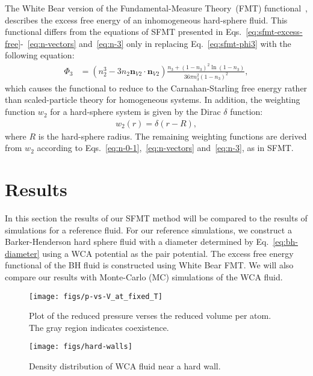 \documentclass[letterpaper,twocolumn,amsmath,amssymb,prb]{revtex4-1}
\begin{document}
The White Bear version of the Fundamental-Measure Theory~(FMT)
functional~\cite{roth2002whitebear}, describes the excess free energy
of an inhomogeneous hard-sphere fluid.  This functional differs
from the equations of SFMT presented in
Eqs.~\ref{eq:sfmt-excess-free}-~\ref{eq:n-vectors} and~\ref{eq:n-3} only in replacing
Eq.~\ref{eq:sfmt-phi3} with the following equation:
\begin{align}
\Phi_3 &= (n_2^3 - 3 n_2 \mathbf{n}_{V2} \cdot \mathbf{n}_{V2}) \frac{
  n_3 + (1-n_3)^2 \ln(1-n_3)
}{
  36\pi n_3^2\left( 1 - n_3 \right)^2
} , 
\end{align}
which causes the functional to reduce to the Carnahan-Starling free
energy rather than scaled-particle theory for homogeneous systems. In
addition, the weighting function $w_2$ for a hard-sphere system is
given by the Dirac $\delta$ function:
\begin{align}
  w_2(r) = \delta(r - R),
\end{align}
where $R$ is the hard-sphere radius. The remaining weighting
functions are derived from $w_2$ according to
Eqs.~\ref{eq:n-0-1},~\ref{eq:n-vectors} and~\ref{eq:n-3}, as in SFMT.

\section{Results}
In this section the results of our SFMT method will be compared to the results of simulations for a reference fluid.
For our reference simulations, we construct a Barker-Henderson hard
sphere fluid with a diameter determined by Eq.~\ref{eq:bh-diameter}
using a WCA potential as the pair potential. The excess free energy functional of the 
BH fluid is constructed using White Bear FMT. 
We will also compare our results with Monte-Carlo (MC) simulations of the WCA fluid. %

\begin{figure}
 \begin{center}
  \texttt{[image: figs/p-vs-V\_at\_fixed\_T]}
 \end{center}
\caption{Plot of the reduced pressure verses the reduced volume per atom. The gray region indicates coexistence.}
\label{fig:p-vs-V_at_fixed_T}
\end{figure}


\begin{figure}
\begin{center}
  \texttt{[image: figs/hard-walls]}
\end{center}
\caption{Density distribution of WCA fluid near a hard wall.}
\label{fig:hard-walls}
\end{figure}
\end{document}
